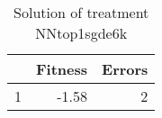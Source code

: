 \begin{table}[ht]
\centering
\begin{tabular}{rrr}
  \hline
 & Fitness & Errors \\ 
  \hline
1 & -1.58 &   2 \\ 
   \hline
\end{tabular}
\caption{Solution of treatment NNtop1sgde6k} 
\end{table}
